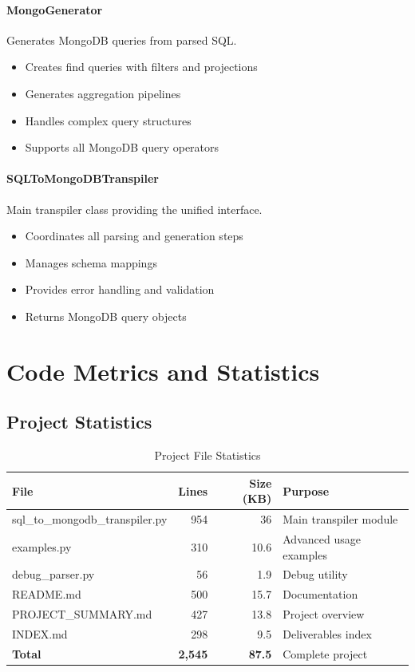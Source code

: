 \documentclass[12pt,a4paper]{article}
\begin{document}
\paragraph{MongoGenerator}
Generates MongoDB queries from parsed SQL.
\begin{itemize}
    \item Creates find queries with filters and projections
    \item Generates aggregation pipelines
    \item Handles complex query structures
    \item Supports all MongoDB query operators
\end{itemize}

\paragraph{SQLToMongoDBTranspiler}
Main transpiler class providing the unified interface.
\begin{itemize}
    \item Coordinates all parsing and generation steps
    \item Manages schema mappings
    \item Provides error handling and validation
    \item Returns MongoDB query objects
\end{itemize}

\newpage

\section{Code Metrics and Statistics}

\subsection{Project Statistics}

\begin{table}[H]
    \centering
    \begin{tabular}{|l|r|r|l|}
        \hline
        \textbf{File} & \textbf{Lines} & \textbf{Size (KB)} & \textbf{Purpose} \\
        \hline
        sql\_to\_mongodb\_transpiler.py & 954 & 36 & Main transpiler module \\
        examples.py & 310 & 10.6 & Advanced usage examples \\
        debug\_parser.py & 56 & 1.9 & Debug utility \\
        README.md & 500 & 15.7 & Documentation \\
        PROJECT\_SUMMARY.md & 427 & 13.8 & Project overview \\
        INDEX.md & 298 & 9.5 & Deliverables index \\
        \hline
        \textbf{Total} & \textbf{2,545} & \textbf{87.5} & Complete project \\
        \hline
    \end{tabular}
    \caption{Project File Statistics}
    \label{tab:file-statistics}
\end{table}
\end{document}
